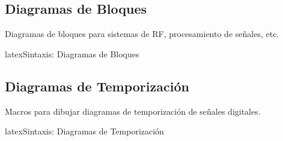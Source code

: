 \begin{rfspecs}[Parámetros S]
\end{rfspecs}

\subsection{Diagramas de Bloques}
\label{subsec:bloques}

Diagramas de bloques para sistemas de RF, procesamiento de señales, etc.

\begin{codigosimple}{latex}{Sintaxis: Diagramas de Bloques}
\begin{blockdiagram}
\end{blockdiagram}
\end{codigosimple}

\begin{blockdiagram}
\end{blockdiagram}

\subsection{Diagramas de Temporización}
\label{subsec:timing}

Macros para dibujar diagramas de temporización de señales digitales.

\begin{codigosimple}{latex}{Sintaxis: Diagramas de Temporización}
\end{codigosimple}

\begin{center}
\end{center}


